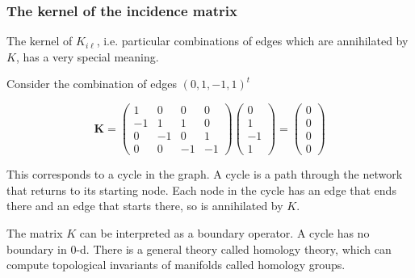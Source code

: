 \documentclass[10pt,aspectratio=169,dvipsnames]{beamer}
\begin{document}
\begin{frame}
  \frametitle{The kernel of the incidence matrix}

  The kernel of $K_{i\ell}$, i.e. particular combinations of edges which
  are annihilated by $K$, has a very special meaning.

  Consider the combination of edges $(0,1,-1,1)^t$

  \begin{equation*}
\mathbf{K}=\left(\begin{matrix}
1 & 0 & 0 & 0\\
-1 & 1 & 1 & 0\\
0 & -1 & 0 & 1\\
0 & 0 & -1 & -1
\end{matrix}\right)\left(\begin{matrix}
0 \\
1 \\
-1 \\
1
\end{matrix}\right) = \left(\begin{matrix}
0 \\
0 \\
0 \\
0
\end{matrix}\right)
\end{equation*}

  This corresponds to a \alert{cycle} in the graph. A cycle is a path
  through the network that returns to its starting node. Each node
  in the cycle has an edge that ends there and an edge that starts
  there, so is annihilated by $K$.

  The matrix $K$ can be interpreted as a \alert{boundary operator}. A
  cycle has no boundary in 0-d. There is a general theory called
  \alert{homology theory}, which can compute topological invariants of
  manifolds called \alert{homology groups}.

\end{frame}
\end{document}
